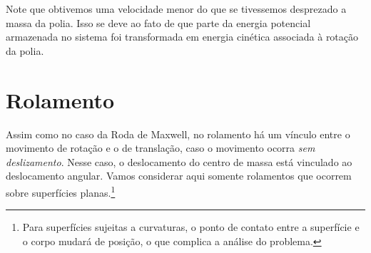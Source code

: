 Note que obtivemos uma velocidade menor do que se tivessemos desprezado a massa da polia. Isso se deve ao fato de que parte da energia potencial armazenada no sistema foi transformada em energia cinética associada à rotação da polia.


\section{Rolamento}

Assim como no caso da Roda de Maxwell, no rolamento há um vínculo entre o movimento de rotação e o de translação, caso o movimento ocorra \emph{sem deslizamento}. Nesse caso, o deslocamento do centro de massa está vinculado ao deslocamento angular. Vamos considerar aqui somente rolamentos que ocorrem sobre superfícies planas.\footnote{Para superfícies sujeitas a curvaturas, o ponto de contato entre a superfície e o corpo mudará de posição, o que complica a análise do problema.}

